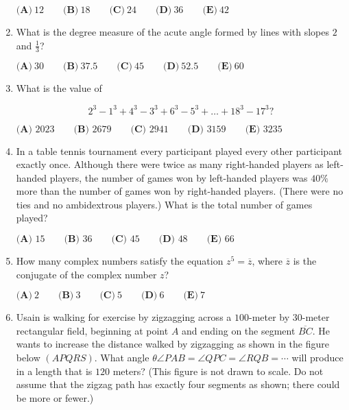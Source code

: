 \documentclass{article}
\begin{document}
\begin{enumerate}[label=\arabic*., itemsep=0.5em]
\(\textbf{(A)}\ 12 \qquad \textbf{(B)}\ 18 \qquad \textbf{(C)}\ 24 \qquad \textbf{(D)}\ 36 \qquad \textbf{(E)}\ 42\)\par \vspace{0.5em}\item What is the degree measure of the acute angle formed by lines with slopes \(2\) and \(\tfrac{1}{3}\)?

\(\textbf{(A)}~30\qquad\textbf{(B)}~37.5\qquad\textbf{(C)}~45\qquad\textbf{(D)}~52.5\qquad\textbf{(E)}~60\)\par \vspace{0.5em}\item What is the value of

\begin{equation*}
2^3 - 1^3 + 4^3 - 3^3 + 6^3 - 5^3 + \dots + 18^3 - 17^3?
\end{equation*}


\(\textbf{(A) } 2023 \qquad\textbf{(B) } 2679 \qquad\textbf{(C) } 2941 \qquad\textbf{(D) } 3159 \qquad\textbf{(E) } 3235\)\par \vspace{0.5em}\item In a table tennis tournament every participant played every other participant exactly once. Although there were twice as many right-handed players as left-handed players, the number of games won by left-handed players was \(40\%\) more than the number of games won by right-handed players. (There were no ties and no ambidextrous players.) What is the total number of games played?

\(\textbf{(A) }15\qquad\textbf{(B) }36\qquad\textbf{(C) }45\qquad\textbf{(D) }48\qquad\textbf{(E) }66\)\par \vspace{0.5em}\item How many complex numbers satisfy the equation \(z^{5}=\overline{z}\), where \(\overline{z}\) is the conjugate of the complex number \(z\)?

\(\textbf{(A)}~2\qquad\textbf{(B)}~3\qquad\textbf{(C)}~5\qquad\textbf{(D)}~6\qquad\textbf{(E)}~7\)\par \vspace{0.5em}\item Usain is walking for exercise by zigzagging across a \(100\)-meter by \(30\)-meter rectangular field, beginning at point \(A\) and ending on the segment \(\overline{BC}\). He wants to increase the distance walked by zigzagging as shown in the figure below \((APQRS)\). What angle \(\theta\)\(\angle PAB=\angle QPC=\angle RQB=\cdots\) will produce in a length that is \(120\) meters? (This figure is not drawn to scale. Do not assume that the zigzag path has exactly four segments as shown; there could be more or fewer.)



\end{enumerate}
\end{document}
